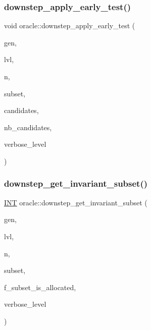 \subsubsection{\texorpdfstring{downstep\+\_\+apply\+\_\+early\+\_\+test()}{downstep\_apply\_early\_test()}}
{\footnotesize\ttfamily void oracle\+::downstep\+\_\+apply\+\_\+early\+\_\+test (\begin{DoxyParamCaption}\item[{\mbox{\hyperlink{classgenerator}{generator}} $\ast$}]{gen,  }\item[{\mbox{\hyperlink{galois_8h_a09fddde158a3a20bd2dcadb609de11dc}{I\+NT}}}]{lvl,  }\item[{\mbox{\hyperlink{galois_8h_a09fddde158a3a20bd2dcadb609de11dc}{I\+NT}}}]{n,  }\item[{\mbox{\hyperlink{galois_8h_a09fddde158a3a20bd2dcadb609de11dc}{I\+NT}} $\ast$}]{subset,  }\item[{\mbox{\hyperlink{galois_8h_a09fddde158a3a20bd2dcadb609de11dc}{I\+NT}} $\ast$}]{candidates,  }\item[{\mbox{\hyperlink{galois_8h_a09fddde158a3a20bd2dcadb609de11dc}{I\+NT}} \&}]{nb\+\_\+candidates,  }\item[{\mbox{\hyperlink{galois_8h_a09fddde158a3a20bd2dcadb609de11dc}{I\+NT}}}]{verbose\+\_\+level }\end{DoxyParamCaption})}

\mbox{\label{classoracle_ae2540e94ee617a407069f976739cfd71}} 
\subsubsection{\texorpdfstring{downstep\+\_\+get\+\_\+invariant\+\_\+subset()}{downstep\_get\_invariant\_subset()}}
{\footnotesize\ttfamily \mbox{\hyperlink{galois_8h_a09fddde158a3a20bd2dcadb609de11dc}{I\+NT}} oracle\+::downstep\+\_\+get\+\_\+invariant\+\_\+subset (\begin{DoxyParamCaption}\item[{\mbox{\hyperlink{classgenerator}{generator}} $\ast$}]{gen,  }\item[{\mbox{\hyperlink{galois_8h_a09fddde158a3a20bd2dcadb609de11dc}{I\+NT}}}]{lvl,  }\item[{\mbox{\hyperlink{galois_8h_a09fddde158a3a20bd2dcadb609de11dc}{I\+NT}} \&}]{n,  }\item[{\mbox{\hyperlink{galois_8h_a09fddde158a3a20bd2dcadb609de11dc}{I\+NT}} $\ast$\&}]{subset,  }\item[{\mbox{\hyperlink{galois_8h_a09fddde158a3a20bd2dcadb609de11dc}{I\+NT}} \&}]{f\+\_\+subset\+\_\+is\+\_\+allocated,  }\item[{\mbox{\hyperlink{galois_8h_a09fddde158a3a20bd2dcadb609de11dc}{I\+NT}}}]{verbose\+\_\+level }\end{DoxyParamCaption})}

